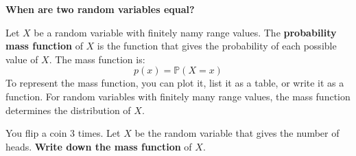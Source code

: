 \documentclass[titlepage, 12pt, leqno]{article}
\begin{document}
\textbf{When are two random variables equal?} 


\begin{definition}
    Let $X$ be a random variable with finitely namy range values. The \textbf{probability mass function} of $X$ is the function that gives the probability of each possible value of $X$. The mass function is:
    \[
    p(x) = \mathbb{P}(X=x)
    \]
   To represent the mass function, you can plot it, list it as a table, or write it as a function. For random variables with finitely many range values, the mass function determines the distribution of $X$. 
\end{definition}

\begin{ex}
    You flip a coin 3 times. Let $X$ be the random variable that gives the number of heads. \textbf{Write down the mass function} of $X$.
\end{ex}
\end{document}
